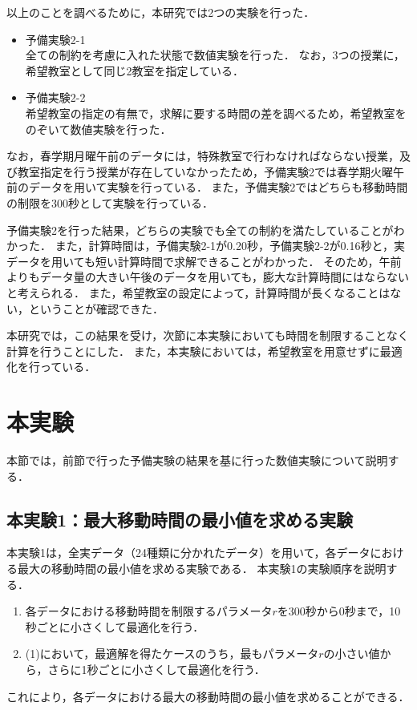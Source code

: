 \documentclass[12pt, a4paper, fleqn]{jreport}
\begin{document}
以上のことを調べるために，本研究では2つの実験を行った．

\begin{itemize}
\item{予備実験2-1}\\
全ての制約を考慮に入れた状態で数値実験を行った．
なお，3つの授業に，希望教室として同じ2教室を指定している．
\item{予備実験2-2}\\
希望教室の指定の有無で，求解に要する時間の差を調べるため，希望教室をのぞいて数値実験を行った．
\end{itemize}

なお，春学期月曜午前のデータには，特殊教室で行わなければならない授業，及び教室指定を行う授業が存在していなかったため，予備実験2では春学期火曜午前のデータを用いて実験を行っている．
また，予備実験2ではどちらも移動時間の制限を300秒として実験を行っている．

予備実験2を行った結果，どちらの実験でも全ての制約を満たしていることがわかった．
また，計算時間は，予備実験2-1が0.20秒，予備実験2-2が0.16秒と，実データを用いても短い計算時間で求解できることがわかった．
そのため，午前よりもデータ量の大きい午後のデータを用いても，膨大な計算時間にはならないと考えられる．
また，希望教室の設定によって，計算時間が長くなることはない，ということが確認できた．






本研究では，この結果を受け，次節に本実験においても時間を制限することなく計算を行うことにした．
また，本実験においては，希望教室を用意せずに最適化を行っている．

\section{本実験}
本節では，前節で行った予備実験の結果を基に行った数値実験について説明する．

\subsection{本実験1：最大移動時間の最小値を求める実験}
本実験1は，全実データ（24種類に分かれたデータ）を用いて，各データにおける最大の移動時間の最小値を求める実験である．
本実験1の実験順序を説明する．
\begin{enumerate}
\item 各データにおける移動時間を制限するパラメータ$r$を300秒から0秒まで，10秒ごとに小さくして最適化を行う．
\item (1)において，最適解を得たケースのうち，最もパラメータ$r$の小さい値から，さらに1秒ごとに小さくして最適化を行う．
\end{enumerate}
これにより，各データにおける最大の移動時間の最小値を求めることができる．
\end{document}
